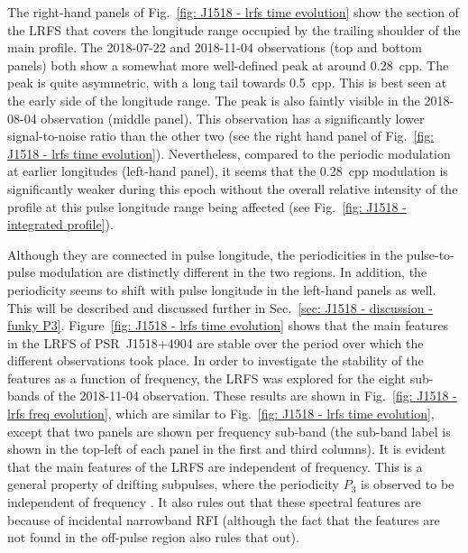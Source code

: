 The right-hand panels of Fig.~\ref{fig: J1518 - lrfs time evolution} show the section of the LRFS that covers the longitude range occupied by the trailing shoulder of the main profile. The 2018-07-22 and 2018-11-04 observations (top and bottom panels) both show a somewhat more well-defined peak at around 0.28~cpp. The peak is quite asymmetric, with a long tail towards 0.5~cpp. This is best seen at the early side of the longitude range. The peak is also faintly visible in the 2018-08-04 observation (middle panel). This observation has a significantly lower signal-to-noise ratio than the other two (see the right hand panel of Fig.~\ref{fig: J1518 - lrfs time evolution}). Nevertheless, compared to the periodic modulation at earlier longitudes (left-hand panel), it seems that the 0.28~cpp modulation is significantly weaker during this epoch without the overall relative intensity of the profile at this pulse longitude range being affected (see Fig.~\ref{fig: J1518 - integrated profile}).

Although they are connected in pulse longitude, the periodicities in the pulse-to-pulse modulation are distinctly different in the two regions. In addition, the periodicity seems to shift with pulse longitude in the left-hand panels as well. This will be described and discussed further in Sec.~\ref{sec: J1518 - discussion - funky P3}.
Figure~\ref{fig: J1518 - lrfs time evolution} shows that the main features in the LRFS of PSR~J1518+4904 are stable over the period over which the different observations took place. In order to investigate the stability of the features as a function of frequency, the LRFS was explored for the eight sub-bands of the 2018-11-04 observation. These results are shown in Fig.~\ref{fig: J1518 - lrfs freq evolution}, which are similar to Fig.~\ref{fig: J1518 - lrfs time evolution}, except that two panels are shown per frequency sub-band (the sub-band label is shown in the top-left of each panel in the first and third columns). It is evident that the main features of the LRFS are independent of frequency. This is a general property of drifting subpulses, where the periodicity $P_3$ is observed to be independent of frequency \citep{WSEx2007}. It also rules out that these spectral features are because of incidental narrowband RFI (although the fact that the features are not found in the off-pulse region also rules that out).




